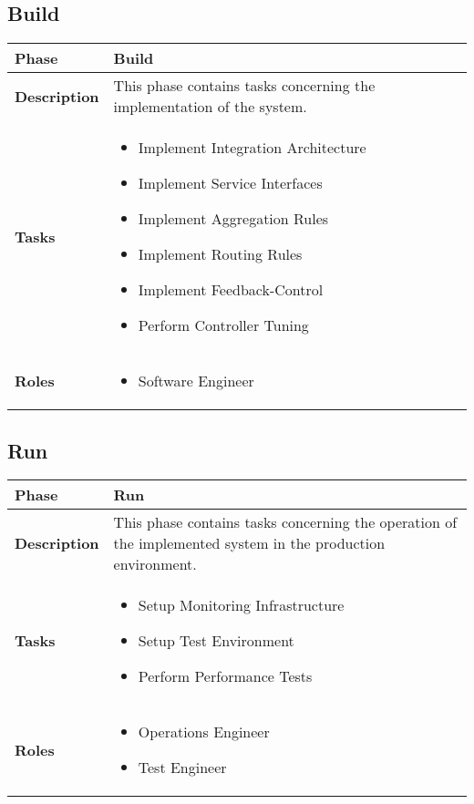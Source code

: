 \subsection{Build}
\begin{minipage}{\textwidth}
\label{table:ch6_View_Build}
\begin{tabular}
	{|m{2cm}|m{10cm}|} \hline \bfseries Phase & Build\\
	\hline \bfseries Description & This phase contains tasks concerning the implementation of the system.\\
	\hline \bfseries Tasks & 
	\begin{itemize}
		\item Implement Integration Architecture
		\item Implement Service Interfaces
		\item Implement Aggregation Rules
		\item Implement Routing Rules
		\item Implement Feedback-Control	
		\item Perform Controller Tuning
	\end{itemize}
	\\
	\hline \bfseries Roles &
	\begin{itemize}
		\item Software Engineer
	\end{itemize}
	\\
	\hline 
\end{tabular}
\end{minipage}

\subsection{Run}
\begin{minipage}{\textwidth}
\label{table:ch6_View_Run}
\begin{tabular}
	{|m{2cm}|m{10cm}|} \hline \bfseries Phase & Run\\
	\hline \bfseries Description & This phase contains tasks concerning the operation of the implemented system in the production environment. \\
	\hline \bfseries Tasks & 
	\begin{itemize}
		\item Setup Monitoring Infrastructure
		\item Setup Test Environment
		\item Perform Performance Tests
	\end{itemize}
	\\
	\hline \bfseries Roles &
	\begin{itemize}
		\item Operations Engineer
		\item Test Engineer
	\end{itemize}
	\\
	\hline 
\end{tabular}
\end{minipage}

